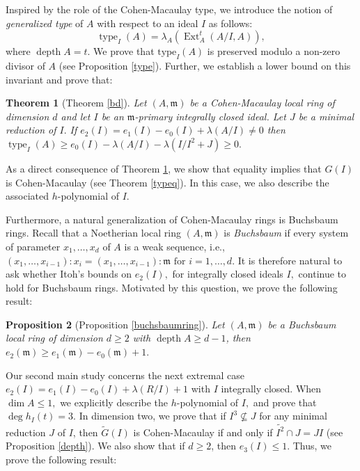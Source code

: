 \documentclass[11pt]{amsart}
\theoremstyle{plain}
\newtheorem{theorem}{Theorem}[section]
\newtheorem{proposition}[theorem]{Proposition}
\newcommand{\m}{\mathfrak{m}}
\newcommand{\wt}{\widetilde}
\newcommand{\depth}{\operatorname{depth}}
\newcommand{\Ext}{\operatorname{Ext}}
\newcommand{\type}{\operatorname{type}}
\theoremstyle{plain}
\begin{document}
Inspired by the role of the Cohen-Macaulay type,  we introduce the notion of \textit{generalized type} of $A$ with respect to an ideal $I$ as follows: $$\type_I(A)=\lambda_A\left(\Ext^t_{A}(A/I,A)\right),$$ 
where $\depth A=t.$  We prove that $\mathrm{type}_{I}(A)$ is preserved modulo a non-zero divisor of $A$ (see Proposition \ref{type}). Further, we establish a lower bound on this invariant and prove that: 
  \begin{theorem}[Theorem \ref{bd}]\label{theorem2}
   Let $(A,\m)$ be a Cohen-Macaulay local ring of dimension $d$ and let $I$ be an $\m$-primary integrally closed ideal. Let $J$ be a minimal reduction of $I.$ If $e_{2}(I)=e_{1}(I)-e_{0}(I)+\lambda(A/I) \neq 0$ then $\type_I(A) \geq e_{0}(I)-\lambda(A/I)-\lambda(I/I^{2}+J)\geq 0.$
\end{theorem}


  

As a direct consequence of Theorem \ref{theorem2}, we show that equality implies that  $G(I)$ is Cohen-Macaulay (see Theorem \ref{typeq}). In this case, we also describe the associated 
 $h$-polynomial  of $I$.

 Furthermore, a natural generalization of Cohen-Macaulay rings is Buchsbaum rings.  Recall that a Noetherian local ring $(A, \mathfrak m)$ is \textit{Buchsbaum} if every system of parameter $x_{1},\ldots,x_{d}$ of $A$ is a weak sequence, i.e., 
     $(x_{1},\ldots,x_{i-1}):x_{i}=(x_{1},\ldots,x_{i-1}):\mathfrak m \text{ for } i=1,\ldots, d.$
It is therefore natural to ask whether Itoh’s bounds \cite{itoh1} on $e_{2}(I),$ for integrally closed ideals $I,$ continue to hold for Buchsbaum rings. Motivated by this question, we prove the following result:

 \begin{proposition}[Proposition \ref{buchsbaumring}] 
    Let $(A,\m)$ be a Buchsbaum local ring of dimension $d \geq 2$ with $\depth A\geq d-1$, then $e_{2}(\m)\geq e_{1}(\m)-e_{0}(\m)+1.$
\end{proposition}

Our second main study concerns the next extremal case
$e_{2}(I)=e_{1}(I)-e_{0}(I)+\lambda(R/I)+1$ with $I$ integrally closed. When $\dim A \leq 1,$ we explicitly describe the $h$-polynomial of $I,$ and prove that $\deg h_{I}(t)=3.$ In dimension two, we prove that if $I^{3} \nsubseteq J$ for any minimal reduction $J$ of $I$, then $\widetilde{G}(I)$ is Cohen-Macaulay if and only if $\wt{I^2}\cap J=JI$ (see Proposition \ref{depth}). We also show that if $d \ge 2$, then $e_3(I) \le 1$. Thus, we prove the following result:
\end{document}
